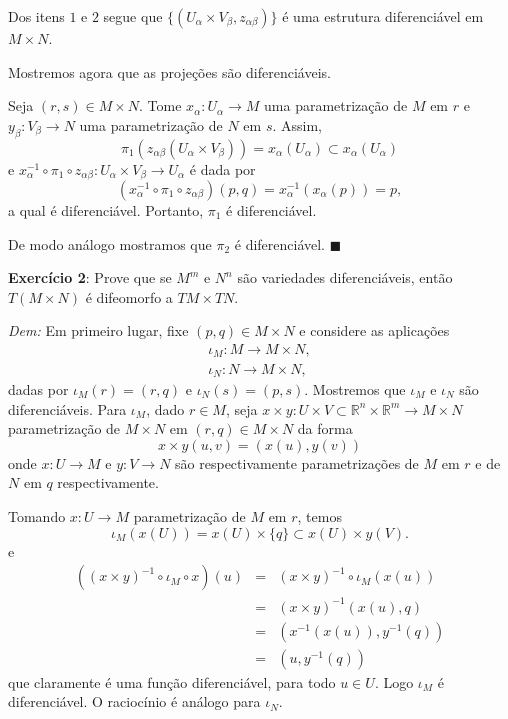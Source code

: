 \documentclass[twoside,openright,titlepage,numbers=noenddot,headinclude,  lineheaders footinclude=true,cleardoublepage=empty,BCOR=5mm,paper=a4,fontsize=12pt ]{scrbook}
\newcommand*{\QEDA}{\hfill\ensuremath{\blacksquare}}
\newcommand{\R}{\mathbb R}
\begin{document}
Dos itens $1$ e $2$ segue que $ \lbrace (U _{\alpha} \times V _{\beta}, z _{\alpha \beta}) \rbrace$ é uma estrutura diferenciável em $M \times N$.

Mostremos agora que as projeções são diferenciáveis.

Seja $(r,s) \in M \times N$. Tome $x_{\alpha} : U_{\alpha} \rightarrow M$ uma parametrização de $M$ em $r$ e $y_{\beta} : V_{\beta} \rightarrow N$ uma parametrização de $N$ em $s$. 
Assim, $$ \pi _1(z_{\alpha \beta} (U_{\alpha} \times V_{\beta})) = x_{\alpha}(U _{\alpha}) \subset x_{\alpha}(U _{\alpha})  $$ 
e $x_{\alpha} ^{-1} \circ \pi _1 \circ z_{\alpha \beta} : U_{\alpha} \times V_{\beta} \rightarrow U_{\alpha}$ é dada por 
$$ (x_{\alpha} ^{-1} \circ \pi _1 \circ z_{\alpha \beta})(p, q) = x_{\alpha}^{-1} (x_{\alpha} (p)) = p ,$$
a qual é diferenciável. 
Portanto, $\pi _1$ é diferenciável.

De modo análogo mostramos que $\pi _2$ é diferenciável. \QEDA

\newpage

\noindent\textbf{Exercício 2}: Prove que se $M^m$ e $N^n$ são variedades diferenciáveis, então $T(M \times N)$ é difeomorfo a $TM \times TN$.

\noindent\textit{Dem:} Em primeiro lugar, fixe $(p,q) \in M \times N$ e considere as aplicações 
\begin{eqnarray*}
    \iota_M: M \longrightarrow M \times N,\\
    \iota_N: N \longrightarrow M \times N,
\end{eqnarray*}
dadas por $\iota_M(r) = (r,q)$ e $\iota_N(s) = (p,s)$. Mostremos que $\iota_M$ e $\iota_N$ são diferenciáveis. Para $\iota_M$, dado $r \in M$, seja $x \times y: U \times V \subset \R^n \times \R^m \longrightarrow M \times N$ parametrização de $M \times N$ em $(r,q) \in M \times N$ da forma 
\begin{equation*}
    x \times y(u,v) = (x(u),y(v))
\end{equation*}
onde $x: U \longrightarrow M$ e $y: V \longrightarrow N$ são respectivamente parametrizações de $M$ em $r$ e de $N$  em $q$ respectivamente.

Tomando $x: U \longrightarrow M$ parametrização de $M$ em $r$, temos 
\begin{equation*}
    \iota_M(x(U)) = x(U) \times \{q\} \subset x(U) \times y(V).
\end{equation*}
e 
\begin{eqnarray*}
    \left( (x\times y)^{-1} \circ \iota_M \circ x\right)(u) &=& (x\times y)^{-1} \circ \iota_M(x(u))\\
    &=&(x\times y)^{-1}(x(u),q)\\
    &=&\left(x^{-1}(x(u)),y^{-1}(q)\right)\\
    &=&\left(u,y^{-1}(q)\right)
\end{eqnarray*}
que claramente é uma função diferenciável, para todo $u \in U$. Logo $\iota_M$ é diferenciável. O raciocínio é análogo para $\iota_N$. 
\end{document}
